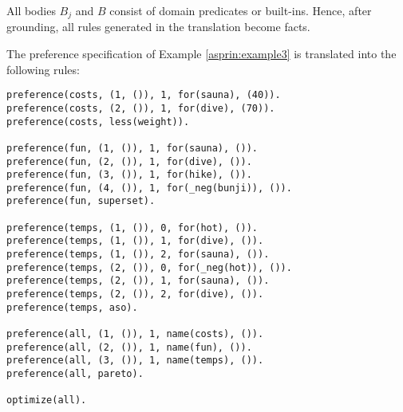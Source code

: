 \begin{note}
All bodies $B_j$ and $B$ consist of domain predicates or built-ins. 
Hence, after grounding, all rules generated in the translation become facts.
\end{note}

\begin{example}
The preference specification of Example \ref{asprin:example3} is translated into the following rules:
\begin{lstlisting}[numbers=none,escapechar=?]
preference(costs, (1, ()), 1, for(sauna), (40)).
preference(costs, (2, ()), 1, for(dive), (70)).
preference(costs, less(weight)).

preference(fun, (1, ()), 1, for(sauna), ()).
preference(fun, (2, ()), 1, for(dive), ()).
preference(fun, (3, ()), 1, for(hike), ()).
preference(fun, (4, ()), 1, for(_neg(bunji)), ()).
preference(fun, superset).

preference(temps, (1, ()), 0, for(hot), ()).
preference(temps, (1, ()), 1, for(dive), ()).
preference(temps, (1, ()), 2, for(sauna), ()).
preference(temps, (2, ()), 0, for(_neg(hot)), ()).
preference(temps, (2, ()), 1, for(sauna), ()).
preference(temps, (2, ()), 2, for(dive), ()).
preference(temps, aso).

preference(all, (1, ()), 1, name(costs), ()).
preference(all, (2, ()), 1, name(fun), ()).
preference(all, (3, ()), 1, name(temps), ()).
preference(all, pareto).

optimize(all).
\end{lstlisting}
\end{example}


